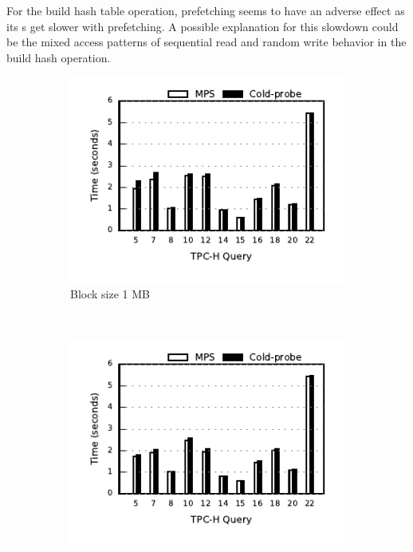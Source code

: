 For the build hash table operation, prefetching seems to have an adverse effect as its \wo{}s get slower with prefetching.
A possible explanation for this slowdown could be the mixed access patterns of sequential read and random write behavior in the build hash operation.

\begin{figure}[ht]
	\centering
	\begin{subfigure}[ht]{0.3\textwidth}
		\includegraphics[width=\textwidth]{pipeline/figures/coldprobe-sequence-20threads-tpch-sf50-bs1mb-withlip-colstore}	
		\caption{Block size 1 MB}
	\end{subfigure}
	~
	\begin{subfigure}[ht]{0.3\textwidth}
		\includegraphics[width=\textwidth]{pipeline/figures/coldprobe-sequence-20threads-tpch-sf50-bs2mb-withlip-colstore}	

\end{subfigure}
\end{figure}
